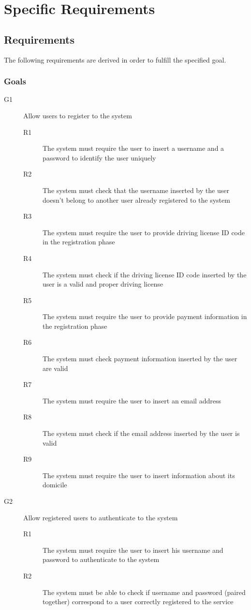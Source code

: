 \section{Specific Requirements}

\subsection{Requirements}
The following requirements are derived in order to fulfill the specified goal.
\subsubsection{Goals}
	\begin{description}
		\item[G1] Allow users to register to the system
		\begin{description}
			\item[R1] The system must require the user to insert a username and a password to identify the user uniquely
			\item[R2] The system must check that the username inserted by the user doesn't belong to another user already registered to the system 
			\item[R3] The system must require the user to provide driving license ID code in the registration phase
			\item[R4] The system must check if the driving license ID code inserted by the user is a valid and proper driving license
			\item[R5] The system must require the user to provide payment information in the registration phase
			\item[R6] The system must check payment information inserted by the user are valid
			\item[R7] The system must require the user to insert an email address
			\item[R8] The system must check if the email address inserted by the user is valid
			\item[R9] The system must  require the user to insert information about its domicile
		\end{description}
		\item[G2] Allow registered users to authenticate to the system
		\begin{description}
			\item[R1] The system must require the user to insert his username and password to authenticate to the system
			\item[R2] The system must be able to check if username and password (paired together) correspond to a user correctly registered to the service

\end{description}
\end{description}
